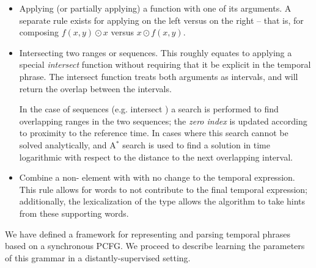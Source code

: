 \begin{itemize}
	\item Applying (or partially applying) a function with one of its
			arguments.
		A separate rule exists for applying on the left versus on the right --
		that is, for composing $f(x,y) \odot x$ versus $x \odot f(x,y)$.
		\needcite
	\item Intersecting two ranges or sequences.
		This roughly equates to applying a special \textit{intersect} function
			without requiring that it be explicit in the temporal phrase.
		The intersect function treats both arguments as intervals, and will return
			the overlap between the intervals.

		In the case of sequences (e.g.  intersect ) a
			search is performed to find overlapping ranges in the two sequences;
			the \textit{zero index} is updated according to proximity to the
			reference time.
		In cases where this search cannot be solved analytically, and A$^{*}$
			search is used to find a solution in time logarithmic with respect to
			the distance to the next overlapping interval.
	\item Combine a non- element with  with no change to the
			temporal expression.
		This rule allows for words to not contribute to the final temporal
			expression;
			additionally, the lexicalization of the  type allows the algorithm
			to take hints from these supporting words.
\end{itemize}

We have defined a framework for representing and parsing temporal phrases
	based on a synchronous PCFG.
We proceed to describe learning the parameters of this grammar in a
	distantly-supervised setting.

